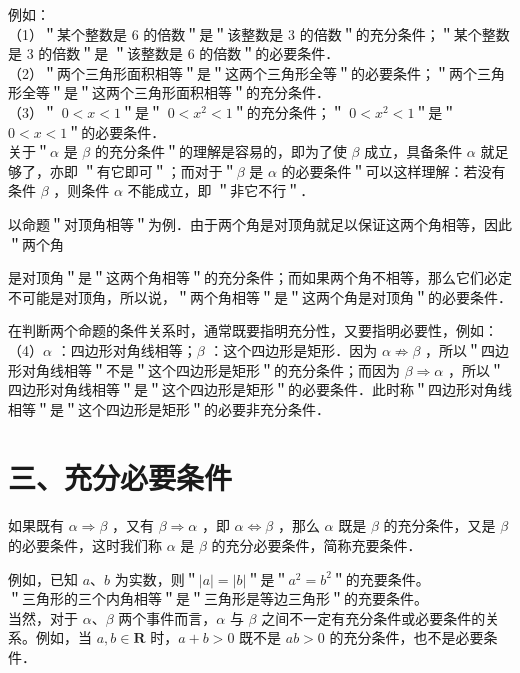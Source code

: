 \documentclass[10pt]{article}
\begin{document}
例如：\\
（1）＂某个整数是 6 的倍数＂是＂该整数是 3 的倍数＂的充分条件；＂某个整数是 3 的倍数＂是 ＂该整数是 6 的倍数＂的必要条件．\\
（2）＂两个三角形面积相等＂是＂这两个三角形全等＂的必要条件；＂两个三角形全等＂是＂这两个三角形面积相等＂的充分条件．\\
（3）＂ \(0<x<1\)＂是＂ \(0<x^{2}<1\)＂的充分条件；＂ \(0<x^{2}<1\)＂是＂ \(0<x<1\)＂的必要条件．\\
关于＂\(\alpha\) 是 \(\beta\) 的充分条件＂的理解是容易的，即为了使 \(\beta\) 成立，具备条件 \(\alpha\) 就足够了，亦即 ＂有它即可＂；而对于＂\(\beta\) 是 \(\alpha\) 的必要条件＂可以这样理解：若没有条件 \(\beta\) ，则条件 \(\alpha\) 不能成立，即 ＂非它不行＂．

以命题＂对顶角相等＂为例．由于两个角是对顶角就足以保证这两个角相等，因此＂两个角

是对顶角＂是＂这两个角相等＂的充分条件；而如果两个角不相等，那么它们必定不可能是对顶角，所以说，＂两个角相等＂是＂这两个角是对顶角＂的必要条件．

在判断两个命题的条件关系时，通常既要指明充分性，又要指明必要性，例如：\\
（4）\(\alpha\) ：四边形对角线相等；\(\beta\) ：这个四边形是矩形．因为 \(\alpha \nRightarrow \beta\) ，所以＂四边形对角线相等＂不是＂这个四边形是矩形＂的充分条件；而因为 \(\beta \Rightarrow \alpha\) ，所以＂四边形对角线相等＂是＂这个四边形是矩形＂的必要条件．此时称＂四边形对角线相等＂是＂这个四边形是矩形＂的必要非充分条件．

\section*{三、充分必要条件}
如果既有 \(\alpha \Rightarrow \beta\) ，又有 \(\beta \Rightarrow \alpha\) ，即 \(\alpha \Leftrightarrow \beta\) ，那么 \(\alpha\) 既是 \(\beta\) 的充分条件，又是 \(\beta\) 的必要条件，这时我们称 \(\alpha\) 是 \(\beta\) 的充分必要条件，简称充要条件．

例如，已知 \(a 、 b\) 为实数，则＂\(|a|=|b|\)＂是＂\(a^{2}=b^{2}\)＂的充要条件。\\
＂三角形的三个内角相等＂是＂三角形是等边三角形＂的充要条件。\\
当然，对于 \(\alpha 、 \beta\) 两个事件而言，\(\alpha\) 与 \(\beta\) 之间不一定有充分条件或必要条件的关系。例如，当 \(a, b \in \mathbf{R}\) 时，\(a+b>0\) 既不是 \(a b>0\) 的充分条件，也不是必要条件．
\end{document}
